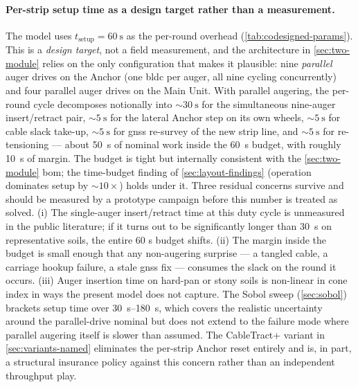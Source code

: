 \documentclass[11pt,a4paper]{article}
\begin{document}
\paragraph{Per-strip setup time as a design target rather than a measurement.} The model uses $t_{\text{setup}} = \SI{60}{\second}$ as the per-round overhead (\cref{tab:codesigned-params}). This is a \emph{design target}, not a field measurement, and the architecture in \cref{sec:two-module} relies on the only configuration that makes it plausible: nine \emph{parallel} auger drives on the Anchor (one \gls{bldc} per auger, all nine cycling concurrently) and four parallel auger drives on the Main Unit. With parallel augering, the per-round cycle decomposes notionally into ${\sim}\SI{30}{\second}$ for the simultaneous nine-auger insert/retract pair, ${\sim}\SI{5}{\second}$ for the lateral Anchor step on its own wheels, ${\sim}\SI{5}{\second}$ for cable slack take-up, ${\sim}\SI{5}{\second}$ for \gls{gnss} re-survey of the new strip line, and ${\sim}\SI{5}{\second}$ for re-tensioning --- about \SI{50}{\second} of nominal work inside the \SI{60}{\second} budget, with roughly \SI{10}{\second} of margin. The budget is tight but internally consistent with the \cref{sec:two-module} \gls{bom}; the time-budget finding of \cref{sec:layout-findings} (operation dominates setup by ${\sim}10\times$) holds under it. Three residual concerns survive and should be measured by a prototype campaign before this number is treated as solved. (i) The single-auger insert/retract time at this duty cycle is unmeasured in the public literature; if it turns out to be significantly longer than \SI{30}{\second} on representative soils, the entire 60 s budget shifts. (ii) The margin inside the budget is small enough that any non-augering surprise --- a tangled cable, a carriage hookup failure, a stale \gls{gnss} fix --- consumes the slack on the round it occurs. (iii) Auger insertion time on hard-pan or stony soils is non-linear in cone index in ways the present model does not capture. The Sobol sweep (\cref{sec:sobol}) brackets setup time over \SIrange{30}{180}{\second}, which covers the realistic uncertainty around the parallel-drive nominal but does not extend to the failure mode where parallel augering itself is slower than assumed. The CableTract+ variant in \cref{sec:variants-named} eliminates the per-strip Anchor reset entirely and is, in part, a structural insurance policy against this concern rather than an independent throughput play.
\end{document}
